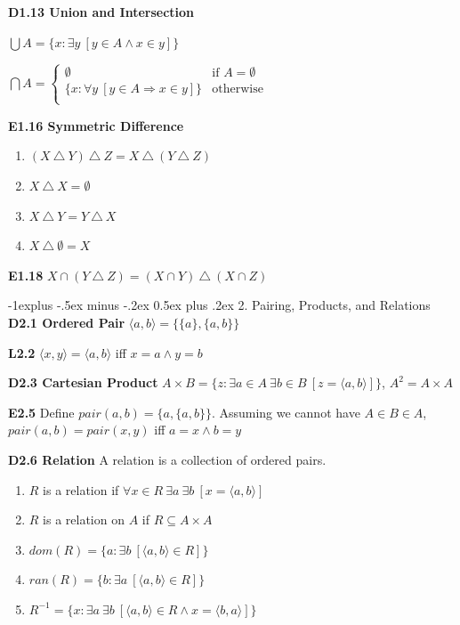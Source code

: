 \documentclass[10pt, landscape]{article}
\makeatletter
\renewcommand{\section}{\@startsection{section}{1}{0mm}%
                                {-1ex plus -.5ex minus -.2ex}%
                                {0.5ex plus .2ex}%
                                {\normalfont\large\bfseries}}
\renewcommand{\section}{\@startsection{section}{2}{0mm}%
                                {-1explus -.5ex minus -.2ex}%
                                {0.5ex plus .2ex}%
                                {\normalfont\normalsize\bfseries}}
\makeatother
\begin{document}
\begin{multicols*}{3}
\textbf{D1.13 Union and Intersection}

$\bigcup A = \{x: \exists y \ [y \in A \land x \in y]\}$

$\bigcap A =
    \left\{
    \begin{array}{lr}
      \emptyset & \text{if $A=\emptyset$} \\
      \{x:\forall y \ [y \in A \Rightarrow x \in y]\} & \text{otherwise} \\
    \end{array}
    \right.
$

\textbf{E1.16 Symmetric Difference}
\begin{enumerate}
    \item $(X\ \triangle\ Y)\ \triangle \ Z = X \ \triangle\ (Y \ \triangle \ 
Z)$
    \item $X \ \triangle \ X = \emptyset$
    \item $X \ \triangle \ Y = Y \ \triangle \ X$
    \item $X \ \triangle \ \emptyset = X$
\end{enumerate}

\textbf{E1.18} $X \cap (Y \ \triangle \ Z) = (X \cap Y) \ \triangle \ (X \cap Z)$


\section{2. Pairing, Products, and Relations}
\textbf{D2.1 Ordered Pair} $\langle a, b \rangle = \{\{a\},\{a,b\}\}$

\textbf{L2.2} $\langle x, y \rangle = \langle a, b \rangle$ iff $x=a \land y = b$

\textbf{D2.3 Cartesian Product} $A \times B=\{z:\exists a \in A\  \exists b \in B \ [z = \langle a, b \rangle]\}$, $A^2 = A \times A$

\textbf{E2.5} Define $pair(a,b)=\{a, \{a, b\}\}$. Assuming we cannot have $A\in B\in A$, $pair(a,b)=pair(x,y)$ iff $a=x \land b = y$

\textbf{D2.6 Relation} A relation is a collection of ordered pairs.
\begin{enumerate}
    \item $R$ is a relation if $\forall x \in R \ \exists a\ \exists b\ [x=\langle a, b \rangle]$
    \item $R$ is a relation on $A$ if $R \subseteq A \times A$
    \item $dom(R)=\{a:\exists b \ [\langle a, b \rangle \in R]\}$
    \item $ran(R)=\{b:\exists a \ [\langle a, b \rangle \in R]\}$
    \item $R^{-1}=\{x:\exists a \ \exists b \ [\langle a, b \rangle \in R \land x = \langle b, a \rangle]\}$
\end{enumerate} 


\end{multicols*}
\end{document}
